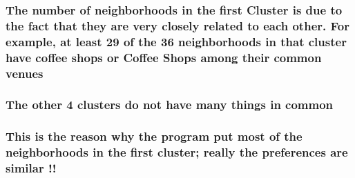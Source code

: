 \documentclass[11pt]{article}
\makeatletter
\newcommand{\boxspacing}{\kern\kvtcb@left@rule\kern\kvtcb@boxsep}
\newcommand{\prompt}[4]{
        \ttfamily\llap{{\color{#2}[#3]:\hspace{3pt}#4}}\vspace{-\baselineskip}
    }
\makeatother
\begin{document}
\hypertarget{the-number-of-neighborhoods-in-the-first-cluster-is-due-to-the-fact-that-they-are-very-closely-related-to-each-other.-for-example-at-least-29-of-the-36-neighborhoods-in-that-cluster-have-coffee-shops-or-coffee-shops-among-their-common-venues}{%
\subsubsection{The number of neighborhoods in the first Cluster is due
to the fact that they are very closely related to each other. For
example, at least 29 of the 36 neighborhoods in that cluster have coffee
shops or Coffee Shops among their common
venues}\label{the-number-of-neighborhoods-in-the-first-cluster-is-due-to-the-fact-that-they-are-very-closely-related-to-each-other.-for-example-at-least-29-of-the-36-neighborhoods-in-that-cluster-have-coffee-shops-or-coffee-shops-among-their-common-venues}}

\hypertarget{the-other-4-clusters-do-not-have-many-things-in-common}{%
\subsubsection{The other 4 clusters do not have many things in
common}\label{the-other-4-clusters-do-not-have-many-things-in-common}}

\hypertarget{this-is-the-reason-why-the-program-put-most-of-the-neighborhoods-in-the-first-cluster-really-the-preferences-are-similar}{%
\subsubsection{This is the reason why the program put most of the
neighborhoods in the first cluster; really the preferences are similar
!!}\label{this-is-the-reason-why-the-program-put-most-of-the-neighborhoods-in-the-first-cluster-really-the-preferences-are-similar}}

    \begin{tcolorbox}[breakable, size=fbox, boxrule=1pt, pad at break*=1mm,colback=cellbackground, colframe=cellborder]
\prompt{In}{incolor}{ }{\boxspacing}
\begin{Verbatim}[commandchars=\\\{\}]

\end{Verbatim}
\end{tcolorbox}


    
    
    
\end{document}
